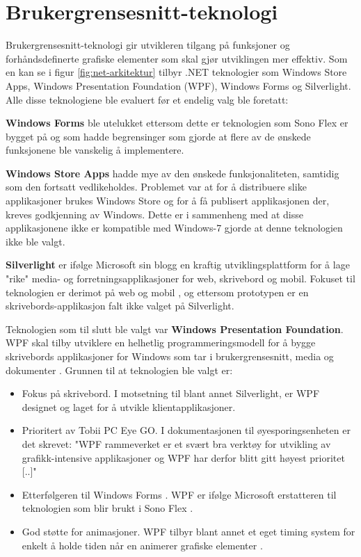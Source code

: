  
\section{Brukergrensesnitt-teknologi} 

Brukergrensesnitt-teknologi gir utvikleren tilgang på funksjoner og forhåndsdefinerte grafiske elementer som skal gjør utviklingen mer effektiv. Som en kan se i figur \ref{fig:net-arkitektur} tilbyr .NET teknologier som Windows Store Apps, Windows Presentation Foundation (\gls{WPF}), Windows Forms og Silverlight. Alle disse teknologiene ble evaluert før et endelig valg ble foretatt:

\textbf{Windows Forms} ble utelukket ettersom dette er teknologien som Sono Flex er bygget på og som hadde begrensinger som gjorde at flere av de ønskede funksjonene ble vanskelig å implementere. 

\textbf{Windows Store Apps} hadde mye av den ønskede funksjonaliteten, samtidig som den fortsatt vedlikeholdes. Problemet var at for å distribuere slike applikasjoner brukes Windows Store og for å få publisert applikasjonen der, kreves godkjenning av Windows. Dette er i sammenheng med at disse applikasjonene ikke er kompatible med Windows-7 \cite{Windo0:online} gjorde at denne teknologien ikke ble valgt. 

\textbf{Silverlight} er ifølge Microsoft sin blogg\cite{User1111:online} en kraftig utviklingsplattform for å lage "rike" media- og forretningsapplikasjoner for web, skrivebord og mobil. Fokuset til teknologien er derimot på web og mobil \cite{Micro6:online}, og ettersom prototypen er en skrivebords-applikasjon falt ikke valget på Silverlight.

Teknologien som til slutt ble valgt var \textbf{Windows Presentation Foundation}. WPF skal tilby utviklere en helhetlig programmeringsmodell for å bygge skrivebords applikasjoner for Windows som tar i brukergrensesnitt, media og dokumenter \cite{Windo777:online}. Grunnen til at teknologien ble valgt er:


\begin{itemize}
\item Fokus på skrivebord. I motsetning til blant annet Silverlight, er WPF designet og laget for å utvikle klientapplikasjoner\cite{Windo777:online}.
\item Prioritert av Tobii PC Eye GO. I dokumentasjonen til øyesporingsenheten er det skrevet: "WPF  rammeverket er et svært bra verktøy for utvikling av grafikk-intensive applikasjoner og WPF har derfor blitt gitt høyest prioritet [..]"
\item Etterfølgeren til Windows Forms . WPF er ifølge Microsoft erstatteren til teknologien som blir brukt i Sono Flex \cite{User1111:online}. 
\item God støtte for animasjoner. WPF tilbyr blant annet et eget timing system for enkelt å holde tiden når en animerer grafiske elementer \cite{Anima7:online}.
\end{itemize}



